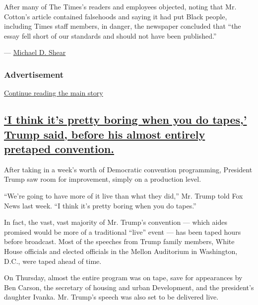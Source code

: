 After many of The Times's readers and employees objected, noting that
Mr. Cotton's article contained falsehoods and saying it had put Black
people, including Times staff members, in danger, the newspaper
concluded that ``the essay fell short of our standards and should not
have been published.''

--- \href{https://www.nytimes3xbfgragh.onion/by/michael-d-shear}{Michael
D. Shear}

\hypertarget{advertisement-3}{%
\subsubsection{Advertisement}\label{advertisement-3}}

\protect\hyperlink{after-dfp-ad-mid4}{Continue reading the main story}

\hypertarget{i-think-its-pretty-boring-when-you-do-tapes-trump-said-before-his-almost-entirely-pretaped-convention}{%
\subsection{\texorpdfstring{\protect\hyperlink{i-think-its-pretty-boring-when-you-do-tapes-trump-said-before-his-almost-entirely-pretaped-convention}{`I
think it's pretty boring when you do tapes,' Trump said, before his
almost entirely pretaped
convention.}}{`I think it's pretty boring when you do tapes,' Trump said, before his almost entirely pretaped convention.}}\label{i-think-its-pretty-boring-when-you-do-tapes-trump-said-before-his-almost-entirely-pretaped-convention}}

After taking in a week's worth of Democratic convention programming,
President Trump saw room for improvement, simply on a production level.

``We're going to have more of it live than what they did,'' Mr. Trump
told Fox News last week. ``I think it's pretty boring when you do
tapes.''

In fact, the vast, vast majority of Mr. Trump's convention --- which
aides promised would be more of a traditional ``live'' event --- has
been taped hours before broadcast. Most of the speeches from Trump
family members, White House officials and elected officials in the
Mellon Auditorium in Washington, D.C., were taped ahead of time.

On Thursday, almost the entire program was on tape, save for appearances
by Ben Carson, the secretary of housing and urban Development, and the
president's daughter Ivanka. Mr. Trump's speech was also set to be
delivered live.

